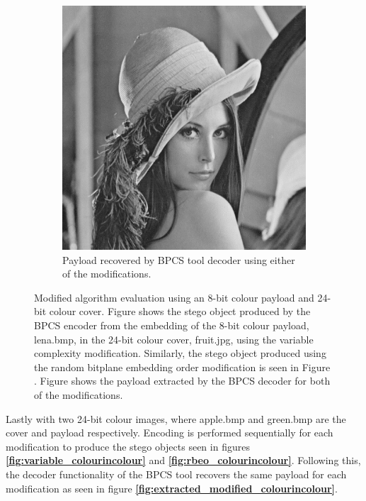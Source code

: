 \documentclass{l4proj}
\begin{document}
\begin{figure}[]
\begin{subfigure}[b]{0.3\textwidth}
        \includegraphics[width=\textwidth]{images/lena.png}
        \caption{Payload recovered by BPCS tool decoder using either of the modifications.}
        \label{fig:extracted_modified_grayincolour}
    \end{subfigure}
    \caption{Modified algorithm evaluation using an 8-bit colour payload and 24-bit colour cover. Figure  shows the stego object produced by the BPCS encoder from the embedding of the 8-bit colour payload, lena.bmp, in the 24-bit colour cover, fruit.jpg, using the variable complexity modification. Similarly, the stego object produced using the random bitplane embedding order modification is seen in Figure . Figure  shows the payload extracted by the BPCS decoder for both of the modifications.}
\end{figure}

Lastly with two 24-bit colour images, where apple.bmp and green.bmp are the cover and payload respectively. Encoding is performed sequentially for each modification to produce the stego objects seen in figures \textbf{\ref{fig:variable_colourincolour}} and \textbf{\ref{fig:rbeo_colourincolour}}. Following this, the decoder functionality of the BPCS tool recovers the same payload for each modification as seen in figure \textbf{\ref{fig:extracted_modified_colourincolour}}.
\end{document}
